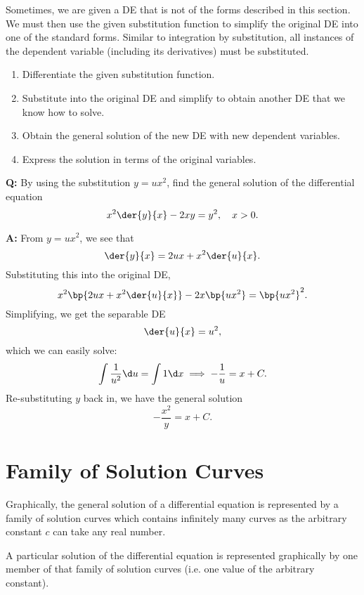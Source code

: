 Sometimes, we are given a DE that is not of the forms described in this section. We must then use the given substitution function to simplify the original DE into one of the standard forms. Similar to integration by substitution, all instances of the dependent variable (including its derivatives) must be substituted.

\begin{recipe}
    \phantom{.}
    \renewcommand{\theenumi}{\arabic{enumi}.}
    \begin{enumerate}
        \item Differentiate the given substitution function.
        \item Substitute into the original DE and simplify to obtain another DE that we know how to solve.
        \item Obtain the general solution of the new DE with new dependent variables.
        \item Express the solution in terms of the original variables.
    \end{enumerate}
    \renewcommand{\theenumi}{(\alph{enumi})}
\end{recipe}

\begin{example}
    \phantom{.}

    \textbf{Q:} By using the substitution $y = ux^2$, find the general solution of the differential equation \[x^2 \der{y}{x} - 2xy = y^2, \quad x > 0.\]

    \textbf{A:} From $y = ux^2$, we see that \[\der{y}{x} = 2ux + x^2 \der{u}{x}.\] Substituting this into the original DE, \[x^2 \bp{2ux + x^2 \der{u}{x}} - 2x \bp{ux^2} = \bp{ux^2}^2.\] Simplifying, we get the separable DE \[\der{u}{x} = u^2,\] which we can easily solve: \[\int \frac1{u^2} \d u = \int 1 \d x \implies -\frac1{u} = x + C.\] Re-substituting $y$ back in, we have the general solution \[-\frac{x^2}{y} = x + C.\]
\end{example}

\section{Family of Solution Curves}

Graphically, the general solution of a differential equation is represented by a family of solution curves which contains infinitely many curves as the arbitrary constant $c$ can take any real number.

A particular solution of the differential equation is represented graphically by one member of that family of solution curves (i.e. one value of the arbitrary constant).

